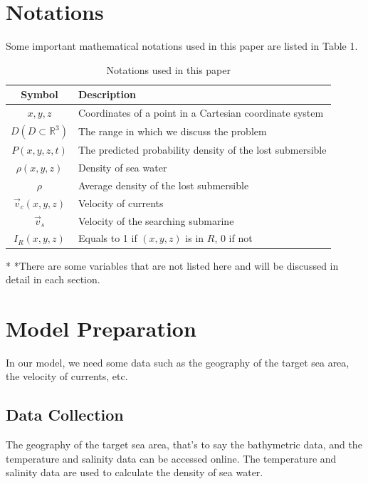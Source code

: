 \documentclass[12pt]{article}
\begin{document}
\section{Notations}
Some important mathematical notations used in this paper are listed in Table 1. 
\begin{table}[H]
\begin{center}
\caption{Notations used in this paper}
\begin{tabular}{c l}
\toprule[2pt]
\multicolumn{1}{m{3cm}}{\centering Symbol}
&\multicolumn{1}{m{8cm}}{\centering Description }\\
\midrule
$x,y,z$& Coordinates of a point in a Cartesian coordinate system \\
$D(D\subset \mathbb{R}^{3})$& The range in which we discuss the problem\\
$P(x,y,z,t)$& The predicted probability density of the lost submersible \\ 
$\rho(x,y,z)$& Density of sea water \\
$\rho$& Average density of the lost submersible \\
$\Vec{v}_{c}(x,y,z)$& Velocity of currents \\
$\vec{v}_{s}$& Velocity of the searching submarine \\
$I_{R}(x,y,z)$& Equals to 1 if $(x,y,z)$ is in $R$, 0 if not\\

\bottomrule[2pt]
\end{tabular}\label{tb:notation}
    \begin{tablenotes}
        \footnotesize
        \item[*] *There are some variables that are not listed here and will be discussed in detail in each section. %
    \end{tablenotes}
\end{center}
\end{table}
\vspace{-1cm}%

\section{Model Preparation}
In our model, we need some data such as the geography of the target sea area, the velocity of currents, etc.

\subsection{Data Collection}
The geography of the target sea area, that's to say the bathymetric data, and the temperature and salinity data can be accessed online. The temperature and salinity data are used to calculate the density of sea water.
\end{document}
